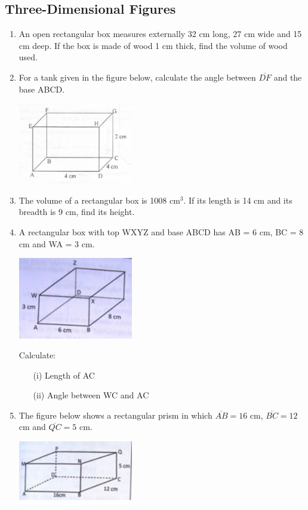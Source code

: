 	
	
	\subsection{Three-Dimensional Figures}
\begin{enumerate}

	\item An open rectangular box measures externally 32 cm long, 27 cm wide and 15 cm deep. If the box is made of wood 1 cm thick, find the volume of wood used.

	\item For a tank given in the figure below, calculate the angle between $\overline{DF}$ and the base ABCD.
	\begin{center}
	\includegraphics[width=5cm]{./img/3d1.jpg}
	\end{center}

	\item The volume of a rectangular box is 1008 cm$^3$. If its length is 14 cm and its breadth is 9 cm, find its height.
	
	\item A rectangular box with top WXYZ and base ABCD has AB = 6 cm, BC = 8 cm and WA = 3 cm.
	\begin{center}
	\includegraphics[width=5cm]{./img/3d2.jpg}
	\end{center}

	Calculate:
	\begin{itemize}
	\item[(i)] Length of AC
	\item[(ii)] Angle between WC and AC
	\end{itemize}
	
	\item The figure below shows a rectangular prism in which $\overline{AB} = 16$ cm, $\overline{BC} = 12$ cm and $\overline{QC} = 5$ cm.
	\begin{center}
	\includegraphics[width=5cm]{./img/3d3.jpg}
	\end{center}


\end{enumerate}
